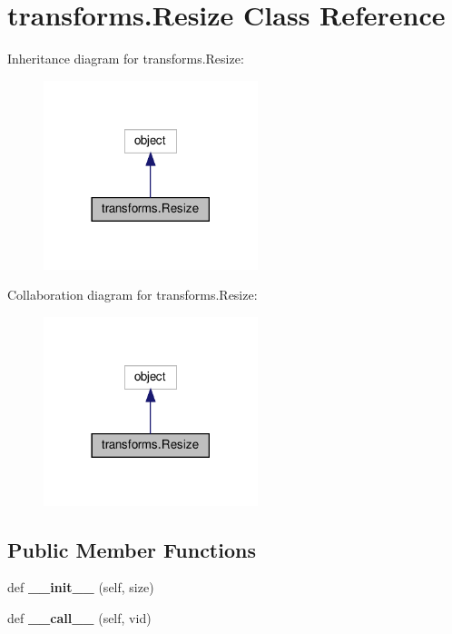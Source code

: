 \hypertarget{classtransforms_1_1Resize}{}\section{transforms.\+Resize Class Reference}
\label{classtransforms_1_1Resize}


Inheritance diagram for transforms.\+Resize\+:
\nopagebreak
\begin{figure}[H]
\begin{center}
\leavevmode
\includegraphics[width=177pt]{classtransforms_1_1Resize__inherit__graph}
\end{center}
\end{figure}


Collaboration diagram for transforms.\+Resize\+:
\nopagebreak
\begin{figure}[H]
\begin{center}
\leavevmode
\includegraphics[width=177pt]{classtransforms_1_1Resize__coll__graph}
\end{center}
\end{figure}
\subsection*{Public Member Functions}
\begin{DoxyCompactItemize}
\item 
\mbox{\label{classtransforms_1_1Resize_af36a02275e9351181c8c2d15b32e8370}} 
def {\bfseries \+\_\+\+\_\+init\+\_\+\+\_\+} (self, size)
\item 
\mbox{\label{classtransforms_1_1Resize_a0ae74933117ee3c604f3238d64ba9ad1}} 
def {\bfseries \+\_\+\+\_\+call\+\_\+\+\_\+} (self, vid)
\end{DoxyCompactItemize}
